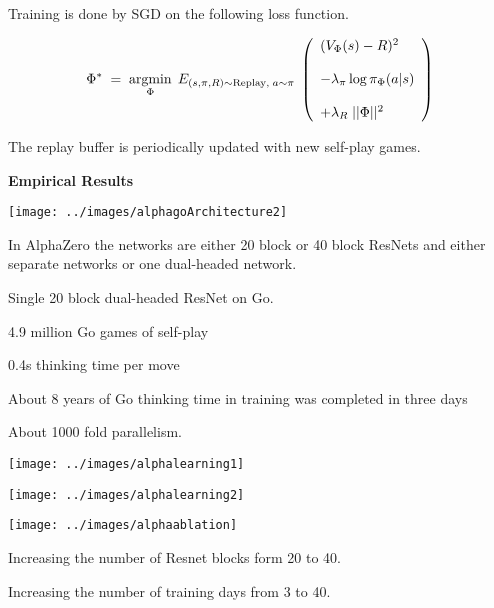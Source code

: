 {

\vfill
Training is done by SGD on the following loss function.

$$\Phi^*\; = \;\operatorname*{argmin}_\Phi \;E_{(s,\pi,R) \sim \mathrm{Replay},\;a \sim \pi}\;\left(\begin{array}{l} (V_\Phi(s) - R)^2 \\ \\ - \lambda_\pi\log \pi_\Phi(a|s) \\ \\ + \lambda_R\;||\Phi||^2\end{array}\right)$$

\vfill
The replay buffer is periodically updated with new self-play games.

\slide{}

\centerline{\bf Empirical Results}
 \vfill


\centerline{\texttt{[image: ../images/alphagoArchitecture2]}}

\vfill
In AlphaZero the networks are either 20 block or 40 block ResNets and either separate networks or one dual-headed network.


Single 20 block dual-headed ResNet on Go.

\vfill
4.9 million Go games of self-play

\vfill
0.4s thinking time per move

\vfill
About 8 years of Go thinking time in training was completed in three days

\vfill
About 1000 fold parallelism.


\centerline{\texttt{[image: ../images/alphalearning1]}}


\centerline{\texttt{[image: ../images/alphalearning2]}}


\centerline{\texttt{[image: ../images/alphaablation]}}


Increasing the number of Resnet blocks form 20 to 40.

\vfill
Increasing the number of training days from 3 to 40.

}

